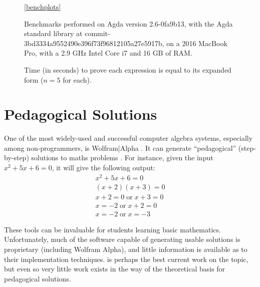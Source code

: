 \documentclass[acmsmall,review,anonymous]{acmart}\settopmatter{printfolios=true,printccs=false,printacmref=false}
\theoremstyle{remark}
\begin{document}
\begin{figure}
\begin{subfigure}[t]{0.3\textwidth}
  \end{subfigure}
  \setcounter{realxtickpos}{0}
  \begin{subfigure}[t]{0.3\textwidth}
    \label{bench3}
  \end{subfigure}
  \ref{benchplots}
  \parbox{0.9\textwidth}{
    \begin{flushleft}
      \caption{Time (in seconds) to prove each expression is equal to its expanded
        form ($n = 5$ for each).}
      \smallskip
      \footnotesize
      Benchmarks performed on Agda version 2.6-0fa9b13, with the Agda standard
      library at commit-3bd3334a9552490e396f73f96812105a27e5917b, on a 2016
      MacBook Pro, with a 2.9 GHz Intel Core i7 and 16 GB of RAM.
    \end{flushleft}
  }
  \label{benchmarks}
\end{figure}
\section{Pedagogical Solutions}
One of the most widely-used and successful computer algebra systems, especially
among non-programmers, is Wolfram|Alpha
\cite{wolfram_research_inc._wolframalpha_2019}. It can generate ``pedagogical''
(step-by-step) solutions to maths
problems \cite{the_development_team_step-by-step_2009}. For instance, given the
input \(x^2 + 5 x + 6 = 0\), it will give the following output:
\begin{align*}
  x^2 + 5x + 6   = 0 \\
  (x + 2)(x + 3) = 0 \\
  x + 2 = 0   \; \text{or} \; x + 3 = 0 \\
  x     = -2  \; \text{or} \; x + 2 = 0 \\
  x     = -2  \; \text{or} \; x     = -3
\end{align*}

These tools can be invaluable for students learning basic mathematics.
Unfortunately, much of the software capable of generating usable solutions is
proprietary (including Wolfram Alpha), and little information is available as to
their implementation techniques. \citet{lioubartsev_constructing_2016} is perhaps
the best current work on the topic, but even so very little work exists in the
way of the theoretical basis for pedagogical solutions.
\end{document}
